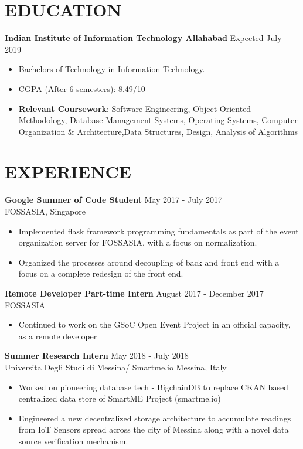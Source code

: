 \documentclass[margin, 7pt]{res} %
\begin{document}
\begin{resume}
\section{EDUCATION}  

\textbf{Indian Institute of Information Technology Allahabad} \hfill Expected July 2019
\begin{itemize}
\item Bachelors of Technology in Information Technology. 
\item CGPA (After 6 semesters): 8.49/10
\item \textbf{Relevant Coursework}: Software Engineering, Object Oriented Methodology, Database Management Systems, Operating Systems, Computer Organization \& Architecture,Data Structures, Design, Analysis of Algorithms
\end{itemize} 

\section{EXPERIENCE}

\textbf{Google Summer of Code Student} \hfill May 2017 - July 2017 \\
FOSSASIA, Singapore
\begin{itemize}
\item Implemented flask framework programming fundamentals as part of the event organization server for FOSSASIA, with a focus on normalization.
\item Organized the processes around decoupling of back and front end with a focus on a complete redesign of the front end.
\end{itemize} 

\textbf{Remote Developer Part-time Intern} \hfill August 2017 - December 2017 \\
FOSSASIA
\begin{itemize}
\item Continued to work on the GSoC Open Event Project in an official capacity, as a remote developer
\end{itemize}

\textbf{Summer Research Intern} \hfill May 2018 - July 2018 \\
Universita Degli Studi di Messina/ Smartme.io Messina, Italy
\begin{itemize}
\item Worked on pioneering database tech - BigchainDB to replace CKAN based centralized data store of SmartME Project (smartme.io)
\item  Engineered a new decentralized storage architecture to accumulate readings from IoT Sensors spread across the city of Messina along with a novel data source verification mechanism.
\end{itemize} 


\end{resume}
\end{document}
